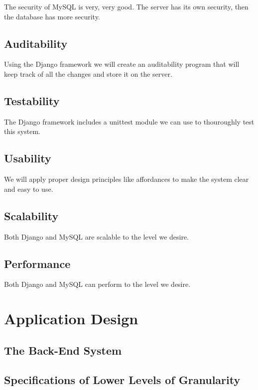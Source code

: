 \documentclass[a4paper]{article}
\begin{document}
The security of MySQL is very, very good. The server has its own security, then the database has more security.

\subsection{Auditability}

Using the Django framework we will create an auditability program that will keep track of all the changes and store it on the server.

\subsection{Testability}

The Django framework includes a unittest module we can use to thouroughly test this system.

\subsection{Usability}

We will apply proper design principles like affordances to make the system clear and easy to use.

\subsection{Scalability}

Both Django and MySQL are scalable to the level we desire.
        
\subsection{Performance}

Both Django and MySQL can perform to the level we desire.

\section{Application Design}
\subsection{The Back-End System}
\subsection*{Specifications of Lower Levels of Granularity}
\end{document}
